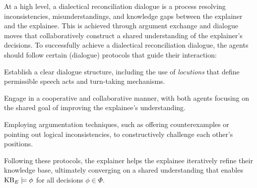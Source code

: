 \documentclass{article}
\begin{document}
At a high level, a dialectical reconciliation dialogue is a process resolving inconsistencies, misunderstandings, and knowledge gaps between the explainer and the explainee. This is achieved through argument exchange and dialogue moves that collaboratively construct a shared understanding of the explainer's decisions. To successfully achieve a dialectical reconciliation dialogue, the agents should follow certain (dialogue) protocols that guide their interaction:

\squishlist
\item Establish a clear dialogue structure, including the use of \emph{locutions} that define permissible speech acts and turn-taking mechanisms.
\item Engage in a cooperative and collaborative manner, with both agents focusing on the shared goal of improving the explainee's understanding.
\item Employing argumentation techniques, such as offering counterexamples or pointing out logical inconsistencies, to constructively challenge each other's positions.

\squishend

Following these protocols, the explainer helps the explainee iteratively refine their knowledge base, ultimately converging on a shared understanding that enables $\mathrm{KB}_E \models \phi$ for all decisions $\phi \in \Phi$. 
\end{document}
